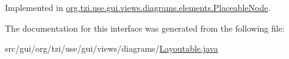 Implemented in \hyperlink{classorg_1_1tzi_1_1use_1_1gui_1_1views_1_1diagrams_1_1elements_1_1_placeable_node_ac8b271927328def828f3799aa3cccea7}{org.\-tzi.\-use.\-gui.\-views.\-diagrams.\-elements.\-Placeable\-Node}.



The documentation for this interface was generated from the following file\-:\begin{DoxyCompactItemize}
\item 
src/gui/org/tzi/use/gui/views/diagrams/\hyperlink{_layoutable_8java}{Layoutable.\-java}\end{DoxyCompactItemize}
